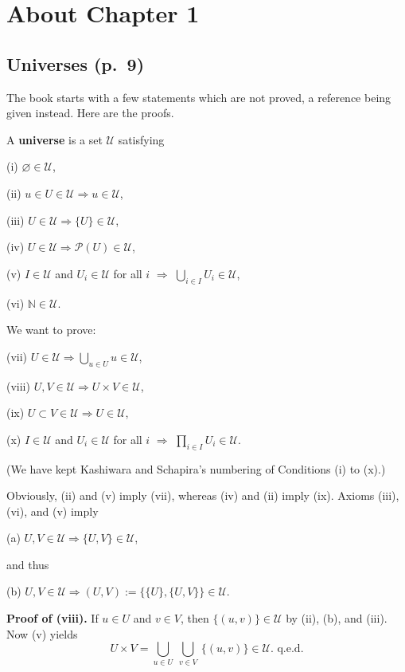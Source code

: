 \documentclass[12pt]{article}%
\theoremstyle{remark}
\theoremstyle{definition}
\newcommand{\then}{\Rightarrow}
\begin{document}

\section{About Chapter 1}

\subsection{Universes (p.~9)}

The book starts with a few statements which are not proved, a reference being given instead. Here are the proofs.

A \textbf{universe}  is a set $\mathcal U$ satisfying 

(i) $\varnothing\in\mathcal U$,

(ii) $u\in U\in\mathcal U\then u\in \mathcal U$,

(iii) $U\in\mathcal U\then\{U\}\in\mathcal U$,

(iv) $U\in\mathcal U\then\mathcal P(U)\in\mathcal U$,

(v) $I\in\mathcal U$ and $U_i\in\mathcal U$ for all $i$ $\then$ $\bigcup_{i\in I}U_i\in\mathcal U$,

(vi) $\mathbb N\in\mathcal U$.

\noindent We want to prove:

(vii) $U\in\mathcal U\then\bigcup_{u\in U}u\in\mathcal U$,

(viii) $U,V\in\mathcal U\then U\times V\in\mathcal U$,

(ix) $U\subset V\in\mathcal U\then U\in\mathcal U$,

(x) $I\in \mathcal U$ and $U_i\in\mathcal U$ for all $i$ $\then$ $\prod_{i\in I}U_i\in\mathcal U$.

\noindent(We have kept Kashiwara and Schapira's numbering of Conditions (i) to (x).) 

\noindent Obviously, (ii) and (v) imply (vii), whereas (iv) and (ii) imply (ix). Axioms (iii), (vi), and (v) imply

(a) $U,V\in\mathcal U\then\{U,V\}\in\mathcal U$,

\noindent and thus

(b) $U,V\in\mathcal U\then(U,V):=\{\{U\},\{U,V\}\}\in\mathcal U$.

\noindent\textbf{Proof of (viii).} If $u\in U$ and $v\in V$, then $\{(u,v)\}\in\mathcal U$ by (ii), (b), and (iii). Now (v) yields 
$$
U\times V=\bigcup_{u\in U}\ \bigcup_{v\in V}\ \{(u,v)\}\in\mathcal U.\text{ q.e.d.} 
$$ 
\end{document}
